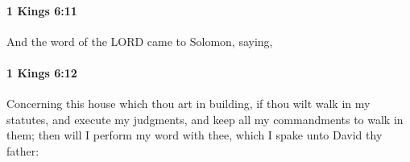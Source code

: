 		\paragraph{1 Kings 6:11} %
			\label{1KINGS-6-11}

			And the word of the LORD came to Solomon, saying,


		\paragraph{1 Kings 6:12} %
			\label{1KINGS-6-12}

			Concerning this house which thou art in building, if thou wilt walk in my statutes, and execute my judgments, and keep all my commandments to walk in them; then will I perform my word with thee, which I spake unto David thy father:


